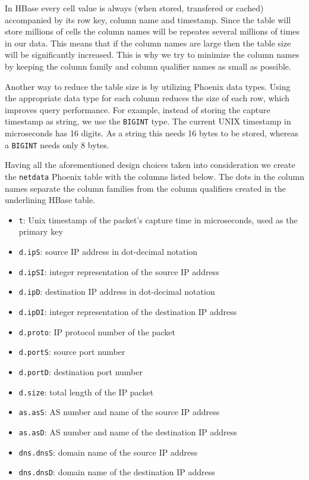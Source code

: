 In HBase every cell value is always (when stored, transfered or cached) accompanied by its row key, column name and timestamp. Since the table will store millions of cells the column names will be repeates several millions of times in our data. This means that if the column names are large then the table size will be significantly increased. This is why we try to minimize the column names by keeping the column family and column qualifier names as small as possible.

Another way to reduce the table size is by utilizing Phoenix data types. Using the appropriate data type for each column reduces the size of each row, which improves query performance. For example, instead of storing the capture timestamp as string, we use the \texttt{BIGINT} type. The current UNIX timestamp in microseconds has 16 digits. As a string this needs 16 bytes to be stored, whereas a \texttt{BIGINT} needs only 8 bytes.

Having all the aforementioned design choices taken into consideration we create the \texttt{netdata} Phoenix table with the columns listed below. The dots in the column names separate the column families from the column qualifiers created in the underlining HBase table.
\begin{itemize}
\item \texttt{t}: Unix timestamp of the packet's capture time in microseconds, used as the primary key
\item \texttt{d.ipS}: source IP address in dot-decimal notation
\item \texttt{d.ipSI}: integer representation of the source IP address
\item \texttt{d.ipD}: destination IP address in dot-decimal notation
\item \texttt{d.ipDI}: integer representation of the destination IP address
\item \texttt{d.proto}: IP protocol number of the packet
\item \texttt{d.portS}: source port number
\item \texttt{d.portD}: destination port number
\item \texttt{d.size}: total length of the IP packet
\item \texttt{as.asS}: AS number and name of the source IP address
\item \texttt{as.asD}: AS number and name of the destination IP address
\item \texttt{dns.dnsS}: domain name of the source IP address
\item \texttt{dns.dnsD}: domain name of the destination IP address
\end{itemize}

